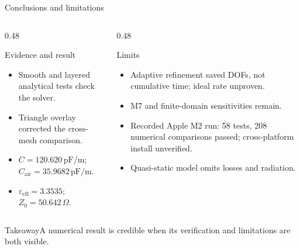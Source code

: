 \documentclass[aspectratio=169,10pt]{beamer}
\newcommand{\epseff}{\varepsilon_{\mathrm{eff}}}
\newcommand{\Cair}{C_{\mathrm{air}}}
\newcommand{\Zzero}{Z_0}
\begin{document}
\begin{frame}{Conclusions and limitations}
\begin{columns}[T]
\begin{column}{0.48\textwidth}
\begin{block}{Evidence and result}
\begin{itemize}
\item Smooth and layered analytical tests check the solver.
\item Triangle overlay corrected the cross-mesh comparison.
\item $C=120.620\,\mathrm{pF/m}$; $\Cair=35.9682\,\mathrm{pF/m}$.
\item $\epseff=3.3535$; $\Zzero=50.642\,\Omega$.
\end{itemize}
\end{block}
\end{column}
\begin{column}{0.48\textwidth}
\begin{block}{Limits}
\begin{itemize}
\item Adaptive refinement saved DOFs, not cumulative time; ideal rate unproven.
\item M7 and finite-domain sensitivities remain.
\item Recorded Apple M2 run: 58 tests, 208 numerical comparisons passed; cross-platform install unverified.
\item Quasi-static model omits losses and radiation.
\end{itemize}
\end{block}
\end{column}
\end{columns}
\begin{alertblock}{Takeaway}A numerical result is credible when its verification and limitations are both visible.\end{alertblock}
\end{frame}
\end{document}
